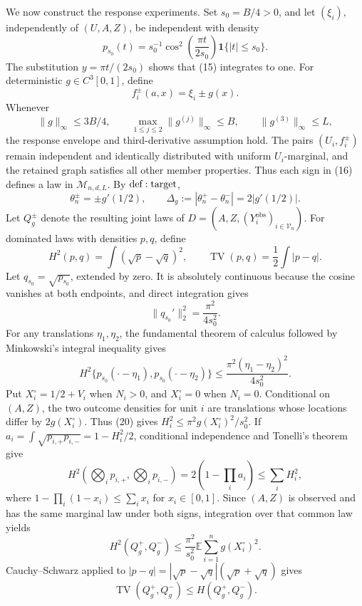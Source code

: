 We now construct the response experiments.  Set \(s_0=B/4>0\), and let \((\xi_i)\), independently of \((U,A,Z)\), be independent with density
\[
 p_{s_0}(t)=s_0^{-1}\cos^2\!\left(\frac{\pi t}{2s_0}\right)
 \mathbf1\{|t|\leq s_0\}.
\tag{15}
\]
The substitution \(y=\pi t/(2s_0)\) shows that (15) integrates to one.  For deterministic \(g\in C^3[0,1]\), define
\[
 f_i^\pm(a,x)=\xi_i\pm g(x).
\tag{16}
\]
Whenever
\[
 \|g\|_\infty\leq3B/4,
 \qquad \max_{1\leq j\leq2}\|g^{(j)}\|_\infty\leq B,
 \qquad \|g^{(3)}\|_\infty\leq L,
\tag{17}
\]
the response envelope and third-derivative assumption hold.  The pairs \((U_i,f_i^\pm)\) remain independent and identically distributed with uniform \(U_i\)-marginal, and the retained graph satisfies all other member properties.  Thus each sign in (16) defines a law in \(\mathcal M_{n,d,L}\).  By \({\rm def:target}\),
\[
 \theta_n^\pm=\pm g'(1/2),
 \qquad \Delta_g:=|\theta_n^+-\theta_n^-|=2|g'(1/2)|.
\tag{18}
\]
Let \(Q_g^\pm\) denote the resulting joint laws of \(D=(A,Z,(Y_i^{\mathrm{obs}})_{i\in\mathcal V_n})\).  For dominated laws with densities \(p,q\), define
\[
 H^2(p,q)=\int(\sqrt p-\sqrt q)^2,
 \qquad \operatorname{TV}(p,q)=\frac12\int|p-q|.
\]
Let \(q_{s_0}=\sqrt{p_{s_0}}\), extended by zero.  It is absolutely continuous because the cosine vanishes at both endpoints, and direct integration gives
\[
 \|q_{s_0}'\|_2^2=\frac{\pi^2}{4s_0^2}.
\tag{19}
\]
For any translations \(\eta_1,\eta_2\), the fundamental theorem of calculus followed by Minkowski's integral inequality gives
\[
 H^2\{p_{s_0}(\mathord\cdot-\eta_1),p_{s_0}(\mathord\cdot-\eta_2)\}
 \leq\frac{\pi^2(\eta_1-\eta_2)^2}{4s_0^2}.
\tag{20}
\]
Put \(X_i^\circ=1/2+V_i\) when \(N_i>0\), and \(X_i^\circ=0\) when \(N_i=0\).  Conditional on \((A,Z)\), the two outcome densities for unit \(i\) are translations whose locations differ by \(2g(X_i^\circ)\).  Thus (20) gives \(H_i^2\leq\pi^2g(X_i^\circ)^2/s_0^2\).  If \(a_i=\int\sqrt{p_{i,+}p_{i,-}}=1-H_i^2/2\), conditional independence and Tonelli's theorem give
\[
 H^2\!\left(\bigotimes_i p_{i,+},\bigotimes_i p_{i,-}\right)
 =2\left(1-\prod_i a_i\right)
 \leq\sum_iH_i^2,
\]
where \(1-\prod_i(1-x_i)\leq\sum_i x_i\) for \(x_i\in[0,1]\).  Since \((A,Z)\) is observed and has the same marginal law under both signs, integration over that common law yields
\[
 H^2(Q_g^+,Q_g^-)
 \leq\frac{\pi^2}{s_0^2}\mathbb E\sum_{i=1}^ng(X_i^\circ)^2.
\tag{21}
\]
Cauchy--Schwarz applied to \(|p-q|=|\sqrt p-\sqrt q|(\sqrt p+\sqrt q)\) gives
\[
 \operatorname{TV}(Q_g^+,Q_g^-)\leq H(Q_g^+,Q_g^-).
\tag{22}
\]


